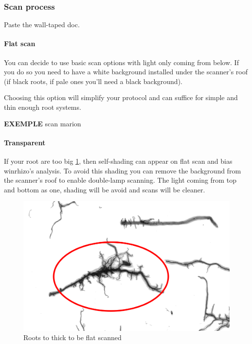\documentclass[
  12pt,
  american,
  a4paper,
  extrafontsizes,onecolumn,openright
  ]{memoir}
\begin{document}
\hypertarget{scan-process}{%
\subsubsection{Scan process}\label{scan-process}}

Paste the wall-taped doc.

\hypertarget{flat-scan}{%
\paragraph{Flat scan}\label{flat-scan}}

You can decide to use basic scan options with light only coming from below. If you do so you need to have a white background installed under the scanner's roof (if black roots, if pale ones you'll need a black background).

Choosing this option will simplify your protocol and can suffice for simple and thin enough root systems.

\textbf{EXEMPLE} scan marion

\hypertarget{transparent}{%
\paragraph{Transparent}\label{transparent}}

If your root are too big \ref{fig:bigroots}, then self-shading can appear on flat scan and bias winrhizo's analysis. To avoid this shading you can remove the background from the scanner's roof to enable double-lamp scanning. The light coming from top and bottom as one, shading will be avoid and scans will be cleaner.

\scriptsize

\begin{figure}

{\centering \includegraphics[width=0.5\linewidth]{document/trait/rootmorpho/thickroot} 

}

\caption{Roots to thick to be flat scanned}\label{fig:bigroots}
\end{figure}
\end{document}
